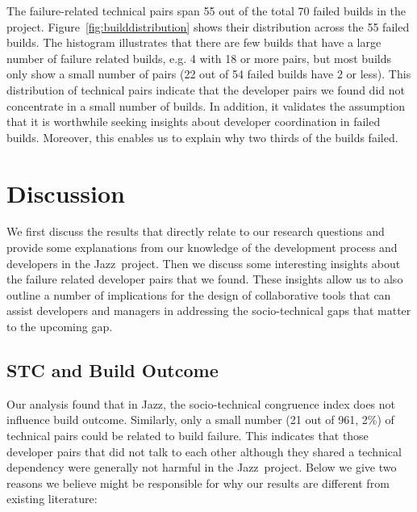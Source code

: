 \documentclass{sig-alternate}
\begin{document}
The failure-related technical pairs span 55 out of the total 70 failed builds in
the project. Figure~\ref{fig:builddistribution} shows their distribution
 across the 55 failed builds. The histogram
illustrates that there are few builds that have a large number of failure related
builds, e.g. 4 with 18 or more pairs, but most builds only show a small number of
pairs (22 out of 54 failed builds have 2 or less). 
This distribution of technical pairs indicate that the developer
pairs we found  did not concentrate in a small number of builds. 
In addition, it validates the assumption that it is
worthwhile seeking insights about developer coordination in failed builds.
Moreover, this enables us to explain why two thirds of the builds failed.















\section{Discussion}
We first discuss the results that directly relate to our research
questions and provide some explanations from our knowledge of the
development process and developers in the Jazz\texttrademark\ project. 
Then we discuss some
interesting insights about the failure related developer pairs that we found.
These insights allow
us to also outline a number of implications
for the design of collaborative tools that can assist developers and managers
in addressing the socio-technical gaps that matter to the upcoming gap.

\subsection{STC and Build Outcome}
\label{subsec:stcandbuild}
%
Our analysis found that in Jazz, the socio-technical congruence index does not
influence build outcome. Similarly, only a small number (21 out of 961, 2\%) of
technical pairs could be related to build
failure. This indicates that those developer pairs that did not talk to each other although they shared a
technical dependency were generally not harmful in the Jazz\texttrademark\ project.
Below we give two reasons we believe might be responsible for why our results are different from existing literature: 
 
\end{document}
